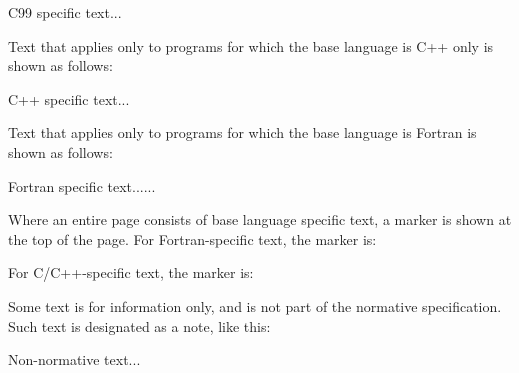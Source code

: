 \begin{c99specific}
C99 specific text...
\end{c99specific}

Text that applies only to programs for which the base language is C++ only is shown as 
follows:

\begin{cppspecific}
C++ specific text...
\end{cppspecific}

Text that applies only to programs for which the base language is Fortran is shown as follows: 

\begin{fortranspecific}
Fortran specific text......
\end{fortranspecific}

Where an entire page consists of base language specific text, a marker is shown
at the top of the page.  For Fortran-specific text, the marker is:

\bigskip
{}
\bigskip

For C/C++-specific text, the marker is:

\bigskip
{}
\bigskip

Some text is for information only, and is not part of the normative specification. Such 
text is designated as a note, like this: 

\begin{note}
Non-normative text...
\end{note}



